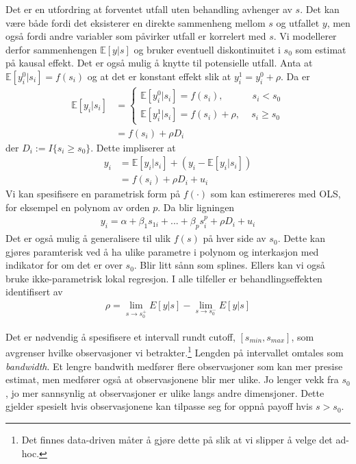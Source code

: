 Det er en utfordring at forventet utfall uten behandling avhenger av $s$. Det kan være både fordi det eksisterer en direkte sammenheng mellom $s$ og utfallet $y$, men også fordi andre variabler som påvirker utfall er korrelert med $s$. Vi modellerer derfor sammenhengen $\mathbb{E}[y|s]$ og bruker eventuell diskontinuitet i $s_0$ som estimat på kausal effekt. Det er også mulig å knytte til potensielle utfall. Anta at $\mathbb{E}[y_i^0|s_i] = f(s_i)$ og at det er konstant effekt slik at $y_i^1=y_i^0+\rho$. Da er
\begin{align}
\mathbb{E}[y_i|s_i] &= 
\begin{cases}
\mathbb{E}[y_i^0|s_i]=f(s_i),\quad\quad\quad s_i < s_0 \\
\mathbb{E}[y_i^1|s_i]=f(s_i) + \rho, \quad\, s_i \geqslant s_0
\end{cases} \\
& = f(s_i)+\rho D_i
\end{align}
der $D_i := I\{s_i \geqslant s_0\}$. Dette impliserer at
\begin{align}
y_i &= \mathbb{E}[y_i|s_i] + (y_i -\mathbb{E}[y_i|s_i]) \\
&= f(s_i)+\rho D_i + u_i
\end{align}
Vi kan spesifisere en parametrisk form på $f(\cdot)$ som kan estimereres med OLS, for eksempel en polynom av orden $p$. Da blir ligningen
\begin{align}
y_i = \alpha +\beta_1s_{1i}+...+\beta_ps^p_{i}+\rho D_i + u_i
\end{align}
Det er også mulig å generalisere til ulik $f(s)$ på hver side av $s_0$. Dette kan gjøres paramterisk ved å ha ulike parametre i polynom og interkasjon med indikator for om det er over $s_0$. Blir litt sånn som splines. Ellers kan vi også bruke ikke-parametrisk lokal regresjon. I alle tilfeller er behandlingseffekten identifisert av
\begin{align}
\rho = \lim_{s\to s_0 ^+}E[y|s]-\lim_{s\to s_0 ^-}E[y|s]
\end{align}

Det er nødvendig å spesifisere et intervall rundt cutoff, $[s_{min}, s_{max}]$, som avgrenser hvilke observasjoner vi betrakter.\footnote{Det finnes data-driven måter å gjøre dette på slik at vi slipper å velge det ad-hoc.} Lengden på intervallet omtales som \textit{bandwidth}. Et lengre bandwith medfører flere observasjoner som kan mer presise estimat, men medfører også at observasjonene blir mer ulike. Jo lenger vekk fra $s_0$, jo mer sannsynlig at observasjoner er ulike langs andre dimensjoner. Dette gjelder spesielt hvis observasjonene kan tilpasse seg for oppnå payoff hvis $s > s_0$. 

